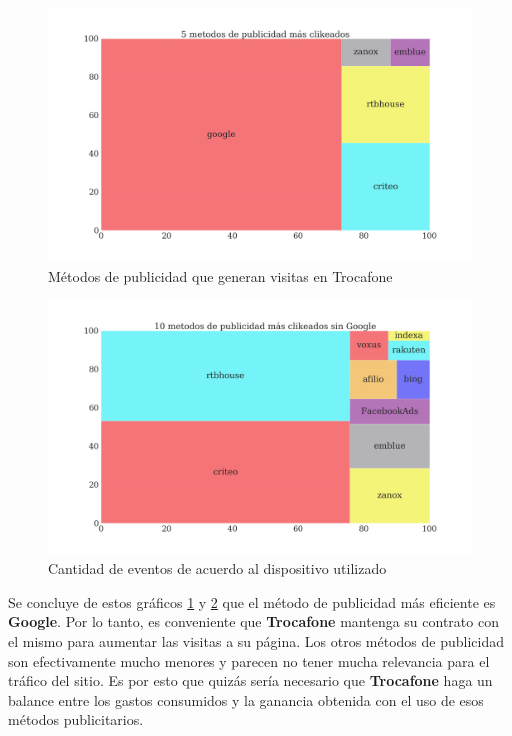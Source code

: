 \documentclass[a4paper]{article}
\begin{document}
\begin{figure}[h!]
	\includegraphics[width=\linewidth]{figures/170-publicidad_clickeada-barplot.png}
	\caption{Métodos de publicidad que generan visitas en Trocafone}
	\label{fig:metodopublicidad}
\end{figure}

\begin{figure}[h!]
	\includegraphics[width=\linewidth]{figures/171-publicidad_sin_google-barplot.png}
	\caption{Cantidad de eventos de acuerdo al dispositivo utilizado}
	\label{fig:metodopublicidadsingoogle}
\end{figure}

Se concluye de estos gráficos \ref{fig:metodopublicidad} y \ref{fig:metodopublicidadsingoogle} que el método de publicidad más eficiente es \textbf{Google}. Por lo tanto, es conveniente que \textbf{Trocafone} mantenga su contrato con el mismo para aumentar las visitas a su página. Los otros métodos de publicidad son efectivamente mucho menores y parecen no tener mucha relevancia para el tráfico del sitio. Es por esto que quizás sería necesario que \textbf{Trocafone} haga un balance entre los gastos consumidos y la ganancia obtenida con el uso de esos métodos publicitarios.
\end{document}
